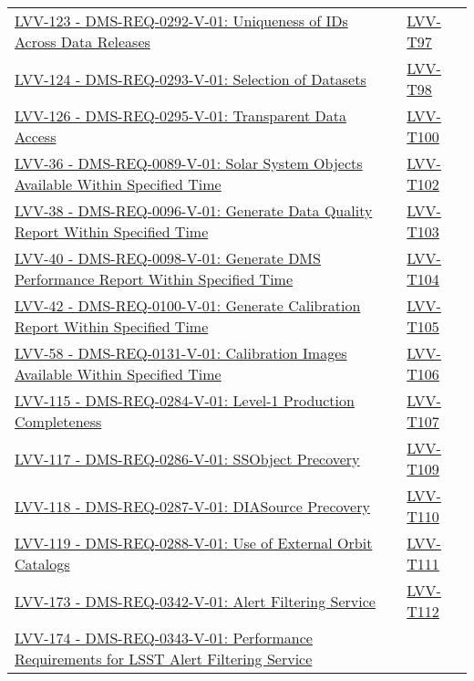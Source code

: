 {\begin{longtable}[]{p{13cm}p{3cm}}
\href{https://jira.lsstcorp.org/browse/LVV-123}{LVV-123 - DMS-REQ-0292-V-01: Uniqueness of IDs Across Data Releases}
& {
\hyperref[lvv-t97]{LVV-T97}
} \\
\href{https://jira.lsstcorp.org/browse/LVV-124}{LVV-124 - DMS-REQ-0293-V-01: Selection of Datasets}
& {
\hyperref[lvv-t98]{LVV-T98}
} \\
\href{https://jira.lsstcorp.org/browse/LVV-126}{LVV-126 - DMS-REQ-0295-V-01: Transparent Data Access}
& {
\hyperref[lvv-t100]{LVV-T100}
} \\
\href{https://jira.lsstcorp.org/browse/LVV-36}{LVV-36 - DMS-REQ-0089-V-01: Solar System Objects Available Within Specified Time}
& {
\hyperref[lvv-t102]{LVV-T102}
} \\
\href{https://jira.lsstcorp.org/browse/LVV-38}{LVV-38 - DMS-REQ-0096-V-01: Generate Data Quality Report Within Specified Time}
& {
\hyperref[lvv-t103]{LVV-T103}
} \\
\href{https://jira.lsstcorp.org/browse/LVV-40}{LVV-40 - DMS-REQ-0098-V-01: Generate DMS Performance Report Within Specified Time}
& {
\hyperref[lvv-t104]{LVV-T104}
} \\
\href{https://jira.lsstcorp.org/browse/LVV-42}{LVV-42 - DMS-REQ-0100-V-01: Generate Calibration Report Within Specified Time}
& {
\hyperref[lvv-t105]{LVV-T105}
} \\
\href{https://jira.lsstcorp.org/browse/LVV-58}{LVV-58 - DMS-REQ-0131-V-01: Calibration Images Available Within Specified Time}
& {
\hyperref[lvv-t106]{LVV-T106}
} \\
\href{https://jira.lsstcorp.org/browse/LVV-115}{LVV-115 - DMS-REQ-0284-V-01: Level-1 Production Completeness}
& {
\hyperref[lvv-t107]{LVV-T107}
} \\
\href{https://jira.lsstcorp.org/browse/LVV-117}{LVV-117 - DMS-REQ-0286-V-01: SSObject Precovery}
& {
\hyperref[lvv-t109]{LVV-T109}
} \\
\href{https://jira.lsstcorp.org/browse/LVV-118}{LVV-118 - DMS-REQ-0287-V-01: DIASource Precovery}
& {
\hyperref[lvv-t110]{LVV-T110}
} \\
\href{https://jira.lsstcorp.org/browse/LVV-119}{LVV-119 - DMS-REQ-0288-V-01: Use of External Orbit Catalogs}
& {
\hyperref[lvv-t111]{LVV-T111}
} \\
\href{https://jira.lsstcorp.org/browse/LVV-173}{LVV-173 - DMS-REQ-0342-V-01: Alert Filtering Service}
& {
\hyperref[lvv-t112]{LVV-T112}
} \\
\href{https://jira.lsstcorp.org/browse/LVV-174}{LVV-174 - DMS-REQ-0343-V-01: Performance Requirements for LSST Alert Filtering Service}

\end{longtable}}
